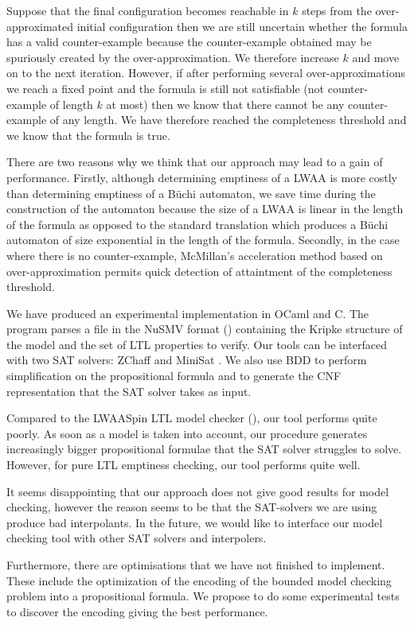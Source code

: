 Suppose that the final configuration becomes reachable in $k$ steps
from the over-approximated initial configuration then we are still
uncertain whether the formula has a valid counter-example because
the counter-example obtained may be spuriously created by the
over-approximation. We therefore increase $k$ and move on to the
next iteration. However, if after performing several
over-approximations we reach a fixed point and the formula is still
not satisfiable (not counter-example of length $k$ at most) then we
know that there cannot be any counter-example of any length. We have
therefore reached the completeness threshold and we know that the
formula is true.


There are two reasons why we think that our approach may lead to a
gain of performance. Firstly, although determining emptiness of a
LWAA is more costly than determining emptiness of a B\"uchi
automaton, we save time during the construction of the automaton
because the size of a LWAA is linear in the length of the formula as
opposed to the standard translation which produces a B\"uchi
automaton of size exponential in the length of the formula.
Secondly, in the case where there is no counter-example, McMillan's
acceleration method based on over-approximation permits quick
detection of attaintment of the completeness threshold.


We have produced an experimental implementation in OCaml and C. The
program parses a file in the NuSMV format (\cite{CAV02:nusmv})
containing the Kripke structure of the model and the set of LTL
properties to verify. Our tools can be interfaced with two SAT
solvers: ZChaff \citep{zChaff} and MiniSat \citep{ES03}. We also use
BDD to perform simplification on the propositional formula and to
generate the CNF representation that the SAT solver takes as input.

Compared to the LWAASpin LTL model checker (\cite{hammer:truly}),
our tool performs quite poorly. As soon as a model is taken into
account, our procedure generates increasingly bigger propositional
formulae that the SAT solver struggles to solve. However, for pure
LTL emptiness checking, our tool performs quite well.

It seems disappointing that our approach does not give good results
for model checking, however the reason seems to be that the
SAT-solvers we are using produce bad interpolants. In the future, we
would like to interface our model checking tool with other SAT
solvers and interpolers.

Furthermore, there are optimisations that we have not finished to
implement. These include the optimization of the encoding of the
bounded model checking problem into a propositional formula. We
propose to do some experimental tests to discover the encoding
giving the best performance.

